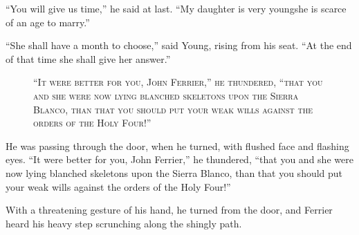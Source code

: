 \documentclass[12pt,english]{book}
\newcommand{\noun}[1]{\textsc{#1}}
\begin{document}
{}``You will give us time,'' he said at last. {}``My daughter is
very young\mdsh{---}she is scarce of an age to marry.''

{}``She shall have a month to choose,'' said Young, rising from
his seat. {}``At the end of that time she shall give her answer.''

%
\begin{figure}[htbp]
\noindent {}

\noindent \begin{center}\noun{{}``It were better for you, John
Ferrier,'' he thundered, {}``that you and she were now lying blanched
skeletons upon the Sierra Blanco, than that you should put your weak
wills against the orders of the Holy Four!''}\end{center}
\end{figure}
He was passing through the door, when he turned, with flushed face
and flashing eyes. {}``It were better for you, John Ferrier,'' he
thundered, {}``that you and she were now lying blanched skeletons
upon the Sierra Blanco, than that you should put your weak wills against
the orders of the Holy Four!''

With a threatening gesture of his hand, he turned from the door, and
Ferrier heard his heavy step scrunching along the shingly path.
\end{document}
